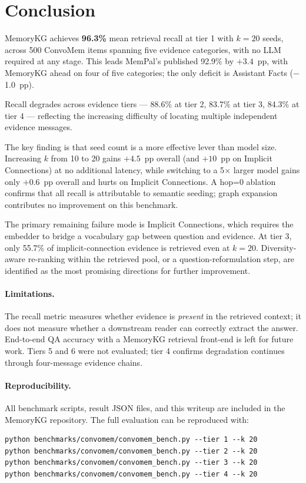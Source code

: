 \documentclass[11pt,a4paper]{article}
\begin{document}
\section{Conclusion}
\label{sec:conclusion}

MemoryKG achieves \textbf{96.3\%} mean retrieval recall at tier 1 with $k{=}20$ seeds,
across 500 ConvoMem items spanning five evidence categories, with no LLM required at
any stage.
This leads MemPal's published 92.9\% by $+3.4$~pp, with MemoryKG ahead on four of
five categories; the only deficit is Assistant Facts ($-$1.0~pp).

Recall degrades across evidence tiers --- 88.6\% at tier 2, 83.7\% at tier 3,
84.3\% at tier 4 --- reflecting the increasing difficulty of locating multiple
independent evidence messages.

The key finding is that seed count is a more effective lever than model size.
Increasing $k$ from 10 to 20 gains $+4.5$~pp overall (and $+10$~pp on Implicit
Connections) at no additional latency, while switching to a 5$\times$ larger model
gains only $+0.6$~pp overall and hurts on Implicit Connections.
A hop=0 ablation confirms that all recall is attributable to semantic seeding; graph
expansion contributes no improvement on this benchmark.

The primary remaining failure mode is Implicit Connections, which requires the embedder
to bridge a vocabulary gap between question and evidence.
At tier 3, only 55.7\% of implicit-connection evidence is retrieved even at $k{=}20$.
Diversity-aware re-ranking within the retrieved pool, or a question-reformulation step,
are identified as the most promising directions for further improvement.

\paragraph{Limitations.}
The recall metric measures whether evidence is \emph{present} in the retrieved context;
it does not measure whether a downstream reader can correctly extract the answer.
End-to-end QA accuracy with a MemoryKG retrieval front-end is left for future work.
Tiers 5 and 6 were not evaluated; tier 4 confirms degradation continues through
four-message evidence chains.

\paragraph{Reproducibility.}
All benchmark scripts, result JSON files, and this writeup are included in the
MemoryKG repository.
The full evaluation can be reproduced with:
\begin{lstlisting}
python benchmarks/convomem/convomem_bench.py --tier 1 --k 20
python benchmarks/convomem/convomem_bench.py --tier 2 --k 20
python benchmarks/convomem/convomem_bench.py --tier 3 --k 20
python benchmarks/convomem/convomem_bench.py --tier 4 --k 20
\end{lstlisting}
\end{document}
